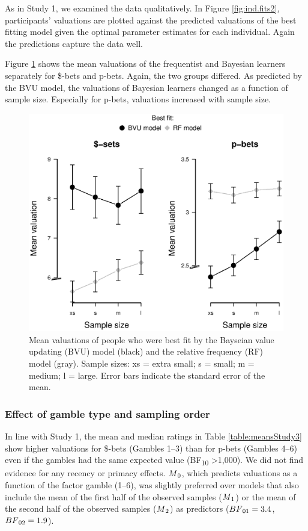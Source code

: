 \documentclass[a4paper,man, natbib]{apa6} %
\begin{document}
As in Study 1, we examined the data qualitatively. In Figure \ref{fig:ind.fits2}, participants' valuations are plotted against the predicted valuations of the best fitting model given the optimal parameter estimates for each individual. Again the predictions capture the data well. %

Figure \ref{fig:qual2} shows the mean valuations of the frequentist and Bayesian learners separately for \$-bets and p-bets. Again, the two groups differed. As predicted by the BVU model, the valuations of Bayesian learners changed as a function of sample size. Especially for p-bets, valuations increased with sample size. 
\begin{figure}[htbp] 
  \centering
\includegraphics[width=.8\linewidth, keepaspectratio]{qual_study2.eps}
  \caption{Mean valuations of people who were best fit by the Bayseian value updating (BVU) model (black) and the relative frequency (RF) model (gray). Sample sizes: xs = extra small; s = small; m = medium; l = large. Error bars indicate the standard error of the mean. 
  }
  \label{fig:qual2}
\end{figure}



\subsubsection{Effect of gamble type and sampling order}
In line with Study 1, the mean and median ratings in Table \ref{table:meansStudy3} show higher valuations for \$-bets (Gambles 1--3) than for p-bets (Gambles 4--6)  even if the gambles had the same expected value (BF\textsubscript{10} \textgreater 1,000). We did not find evidence for any recency or primacy effects. $M\textsubscript{0}$, which predicts valuations as a function of the factor gamble (1--6), was slightly preferred over models that also include the mean of the first half of the observed samples ($M\textsubscript{1}$) or the mean of the second half of the observed samples ($M\textsubscript{2}$) as predictors ($BF\textsubscript{01} = 3.4$, $BF\textsubscript{02} = 1.9$). 
\end{document}
